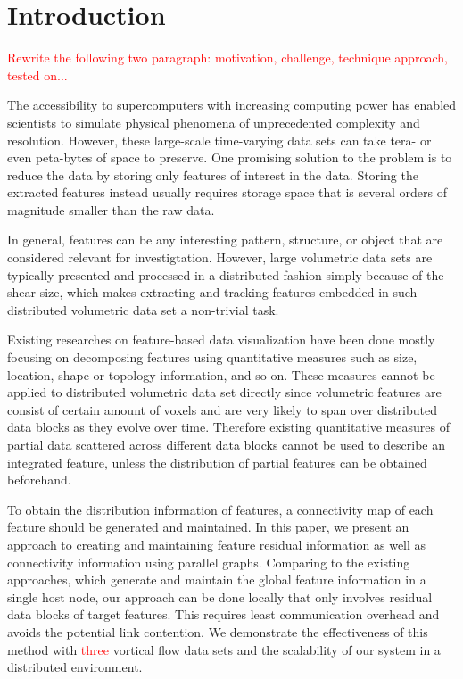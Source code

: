 \documentclass[10pt, conference, compsocconf]{IEEEtran}
\begin{document}
\section{Introduction}
\textcolor{red}{Rewrite the following two paragraph: motivation, challenge, technique approach, tested on...}

The accessibility to supercomputers with increasing computing power has enabled scientists to simulate physical phenomena of unprecedented complexity and resolution. However, these large-scale time-varying data sets can take tera- or even peta-bytes of space to preserve. One promising solution to the problem is to reduce the data by storing only features of interest in the data. Storing the extracted features instead usually requires storage space that is several orders of magnitude smaller than the raw data.

In general, features can be any interesting pattern, structure, or object that are considered relevant for investigtation. However, large volumetric data sets are typically presented and processed in a distributed fashion simply because of the shear size, which makes extracting and tracking features embedded in such distributed volumetric data set a non-trivial task. 

Existing researches on feature-based data visualization have been done mostly focusing on decomposing features using quantitative measures such as size, location, shape or topology information, and so on. These measures cannot be applied to distributed volumetric data set directly since volumetric features are consist of certain amount of voxels and are very likely to span over distributed data blocks as they evolve over time. Therefore existing quantitative measures of partial data scattered across different data blocks cannot be used to describe an integrated feature, unless the distribution of partial features can be obtained beforehand.

To obtain the distribution information of features, a connectivity map of each feature should be generated and maintained. In this paper, we present an approach to creating and maintaining feature residual information as well as connectivity information using parallel graphs. Comparing to the existing approaches, which generate and maintain the global feature information in a single host node, our approach can be done locally that only involves residual data blocks of target features. This requires least communication overhead and avoids the potential link contention. We demonstrate the effectiveness of this method with \textcolor{red}{three} vortical flow data sets and the scalability of our system in a distributed environment.
\end{document}
